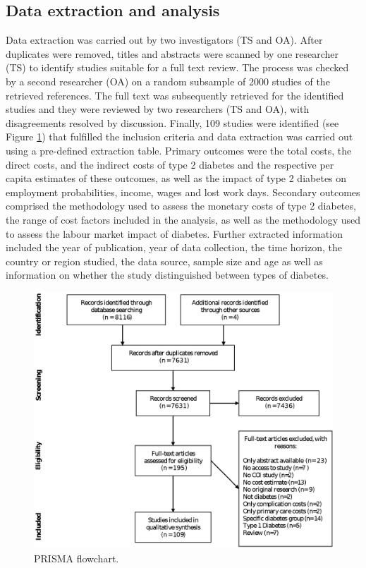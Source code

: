 \subsection{Data extraction and analysis}
Data extraction was carried out by two investigators (TS and OA). After duplicates were removed, titles and abstracts were scanned by one researcher (TS) to identify studies suitable for a full text review. The process was checked by a second researcher (OA) on a random subsample of 2000 studies of the retrieved references. The full text was subsequently retrieved for the identified studies and they were reviewed by two researchers (TS and OA), with disagreements resolved by discussion. Finally, 109 studies were identified (see Figure \ref{fig:review_prisma_flowchart}) that fulfilled the inclusion criteria and data extraction was carried out using a pre-defined extraction table. Primary outcomes were the total costs, the direct costs, and the indirect costs of type 2 diabetes and the respective per capita estimates of these outcomes, as well as the impact of type 2 diabetes on employment probabilities, income, wages and lost work days. Secondary outcomes comprised the methodology used to assess the monetary costs of type 2 diabetes, the range of cost factors included in the analysis, as well as the methodology used to assess the labour market impact of diabetes. Further extracted information included the year of publication, year of data collection, the time horizon, the country or region studied, the data source, sample size and age as well as information on whether the study distinguished between types of diabetes.


\begin{figure}[p]
\caption{\label{fig:review_prisma_flowchart}\acs*{PRISMA} flowchart.}%
\centering
\includegraphics[width=0.9\linewidth]{Review/Figures/Fig1.eps}
\end{figure}

